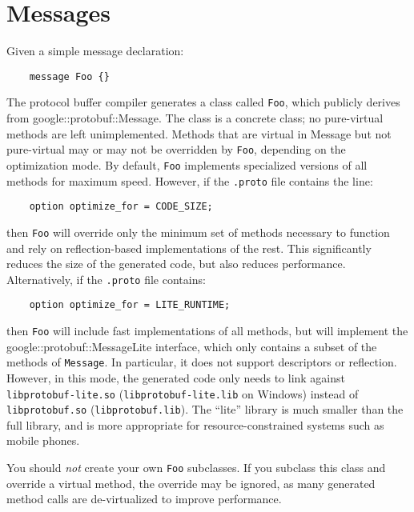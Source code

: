 \section{Messages}
Given a simple message declaration:
\begin{verbatim}
    message Foo {}
\end{verbatim}
The protocol buffer compiler generates a class called \texttt{Foo}, which publicly derives from google::protobuf::Message. The class is a concrete class; no pure-virtual methods are left unimplemented. Methods that are virtual in Message but not pure-virtual may or may not be overridden by \texttt{Foo}, depending on the optimization mode. By default, \texttt{Foo} implements specialized versions of all methods for maximum speed. However, if the \texttt{.proto} file contains the line:
\begin{verbatim}
    option optimize_for = CODE_SIZE;
\end{verbatim}
then \texttt{Foo} will override only the minimum set of methods necessary to function and rely on reflection-based implementations of the rest. This significantly reduces the size of the generated code, but also reduces performance. Alternatively, if the \texttt{.proto} file contains:
\begin{verbatim}
    option optimize_for = LITE_RUNTIME;
\end{verbatim}

then \texttt{Foo} will include fast implementations of all methods, but will implement the google::protobuf::MessageLite interface, which only contains a subset of the methods of \texttt{Message}. In particular, it does not support descriptors or reflection. However, in this mode, the generated code only needs to link against \texttt{libprotobuf-lite.so} (\texttt{libprotobuf-lite.lib} on Windows) instead of \texttt{libprotobuf.so} (\texttt{libprotobuf.lib}). The \enquote{lite} library is much smaller than the full library, and is more appropriate for resource-constrained systems such as mobile phones.

You should \emph{not} create your own \texttt{Foo} subclasses. If you subclass this class and override a virtual method, the override may be ignored, as many generated method calls are de-virtualized to improve performance.

